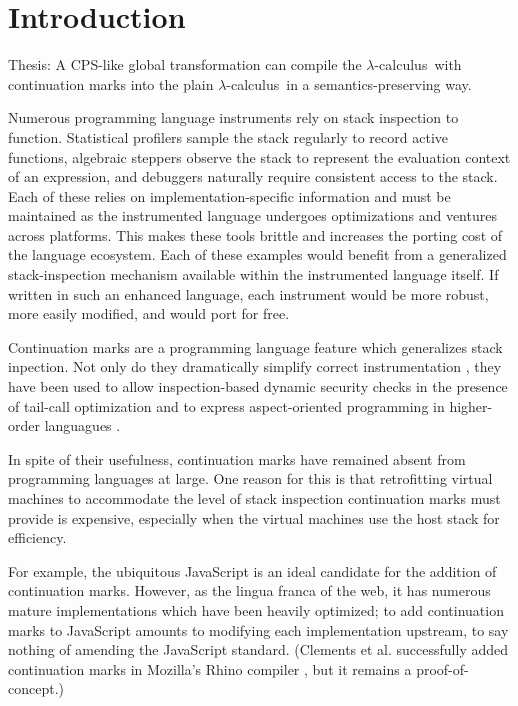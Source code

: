 \documentclass[ms,electronic,twosidetoc,letterpaper,chaptercenter,parttop]{byumsphd}
\title{\Title}
\author{\Author}
\newcommand{\lc}{$\lambda$-calculus}
\begin{document}
\maketitle
{}

\chapter{Introduction}

Thesis: A CPS-like global transformation can compile the \lc\ with continuation marks into
the plain \lc\ in a semantics-preserving way.

Numerous programming language instruments rely on stack inspection to function. Statistical profilers sample the stack regularly to record active functions, algebraic steppers observe the stack to represent the evaluation context of an expression, and debuggers naturally require consistent access to the stack. Each of these relies on implementation-specific information and must be maintained as the instrumented language undergoes optimizations and ventures across platforms. This makes these tools brittle and increases the porting cost of the language ecosystem. Each of these examples would benefit from a generalized stack-inspection mechanism available within the instrumented language itself. If written in such an enhanced language, each instrument would be more robust, more easily modified, and would port for free.

Continuation marks \cite{clements2006portable} are a programming language feature which generalizes stack inpection. Not only do they dramatically simplify correct instrumentation \cite{clements2001modeling}, they have been used to allow inspection-based dynamic security checks in the presence of tail-call optimization \cite{clements2004tail} and to express aspect-oriented programming in higher-order languagues \cite{tucker2003pointcuts}.

In spite of their usefulness, continuation marks have remained absent from programming languages at large. One reason for this is that retrofitting virtual machines to accommodate the level of stack inspection continuation marks must provide is expensive, especially when the virtual machines use the host stack for efficiency.

For example, the ubiquitous JavaScript is an ideal candidate for the addition of continuation marks. However, as the lingua franca of the web, it has numerous mature implementations which have been heavily optimized; to add continuation marks to JavaScript amounts to modifying each implementation upstream, to say nothing of amending the JavaScript standard. (Clements et al. successfully added continuation marks in Mozilla's Rhino compiler \cite{clements2008implementing}, but it remains a proof-of-concept.)
\end{document}
